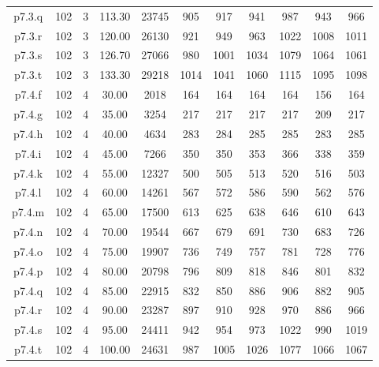 \begin{center}
\begin{tabular}{ |c|c|c|c|c|c|c|c|c|c|c| }
p7.3.q & 102 & 3 & 113.30 & 23745 & 905 & 917 & 941 & 987 & 943 & 966  \\
p7.3.r & 102 & 3 & 120.00 & 26130 & 921 & 949 & 963 & 1022 & 1008 & 1011  \\
p7.3.s & 102 & 3 & 126.70 & 27066 & 980 & 1001 & 1034 & 1079 & 1064 & 1061  \\
p7.3.t & 102 & 3 & 133.30 & 29218 & 1014 & 1041 & 1060 & 1115 & 1095 & 1098  \\
p7.4.f & 102 & 4 & 30.00 & 2018 & 164 & 164 & 164 & 164 & 156 & 164  \\
p7.4.g & 102 & 4 & 35.00 & 3254 & 217 & 217 & 217 & 217 & 209 & 217  \\
p7.4.h & 102 & 4 & 40.00 & 4634 & 283 & 284 & 285 & 285 & 283 & 285  \\
p7.4.i & 102 & 4 & 45.00 & 7266 & 350 & 350 & 353 & 366 & 338 & 359  \\
p7.4.k & 102 & 4 & 55.00 & 12327 & 500 & 505 & 513 & 520 & 516 & 503  \\
p7.4.l & 102 & 4 & 60.00 & 14261 & 567 & 572 & 586 & 590 & 562 & 576  \\
p7.4.m & 102 & 4 & 65.00 & 17500 & 613 & 625 & 638 & 646 & 610 & 643  \\
p7.4.n & 102 & 4 & 70.00 & 19544 & 667 & 679 & 691 & 730 & 683 & 726  \\
p7.4.o & 102 & 4 & 75.00 & 19907 & 736 & 749 & 757 & 781 & 728 & 776  \\
p7.4.p & 102 & 4 & 80.00 & 20798 & 796 & 809 & 818 & 846 & 801 & 832  \\
p7.4.q & 102 & 4 & 85.00 & 22915 & 832 & 850 & 886 & 906 & 882 & 905  \\
p7.4.r & 102 & 4 & 90.00 & 23287 & 897 & 910 & 928 & 970 & 886 & 966  \\
p7.4.s & 102 & 4 & 95.00 & 24411 & 942 & 954 & 973 & 1022 & 990 & 1019  \\
p7.4.t & 102 & 4 & 100.00 & 24631 & 987 & 1005 & 1026 & 1077 & 1066 & 1067  \\
\hline
\end{tabular}
\end{center}